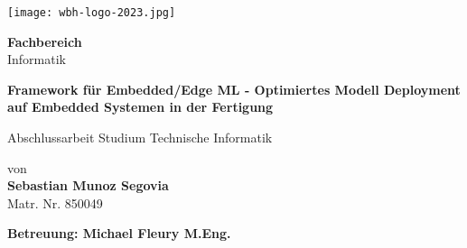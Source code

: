 \documentclass[a4paper]{report}
\begin{document}
\begin{titlepage}
    \centering
    \texttt{[image: wbh-logo-2023.jpg]}
    \vspace{1.5cm}

    \textbf{\large Fachbereich} \\
    Informatik
    \vspace{2.5cm}

    {\Huge \textbf{Framework für Embedded/Edge ML - Optimiertes Modell Deployment auf Embedded Systemen in der Fertigung}}
    \vspace{0.5cm}

    {\large Abschlussarbeit Studium Technische Informatik}
    \vspace{2cm}

    von \\
    \textbf{Sebastian Munoz Segovia} \\
    Matr. Nr. 850049
    \vspace{2cm}

    \textbf{Betreuung: Michael Fleury M.Eng.}
    \vspace{2cm}

\end{titlepage}

\tableofcontents
\listoffigures
\listoftables











\appendix




\end{document}

